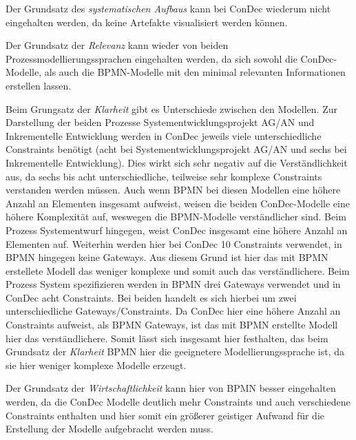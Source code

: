 Der  Grundsatz des \textit{systematischen Aufbaus} kann bei ConDec wiederum nicht eingehalten werden, da keine Artefakte visualisiert werden können.\newline

Der Grundsatz der \textit{Relevanz} kann wieder von beiden Prozessmodellierungssprachen eingehalten werden, da sich sowohl die ConDec-Modelle, als auch die BPMN-Modelle mit den minimal relevanten Informationen erstellen lassen.\newline


Beim Grungsatz der \textit{Klarheit} gibt es Unterschiede zwischen den Modellen. Zur Darstellung der beiden Prozesse Systementwicklungsprojekt AG/AN und Inkrementelle Entwicklung werden in ConDec jeweils viele unterschiedliche Constraints benötigt (acht bei Systementwicklungsprojekt AG/AN und sechs bei Inkrementelle Entwicklung). Dies wirkt sich sehr negativ auf die Verständlichkeit aus, da sechs bis acht unterschiedliche, teilweise sehr komplexe Constraints verstanden werden müssen. Auch wenn BPMN bei diesen Modellen eine höhere Anzahl an Elementen insgesamt aufweist, weisen die beiden ConDec-Modelle eine höhere Komplexität auf, weswegen die BPMN-Modelle verständlicher sind. \newline
Beim Prozess Systementwurf hingegen, weist ConDec  insgesamt eine höhere Anzahl an Elementen auf. Weiterhin werden hier bei ConDec 10 Constraints verwendet, in BPMN hingegen keine Gateways. Aus diesem Grund ist hier das mit BPMN erstellete Modell das weniger komplexe und somit auch das verständlichere.\newline
Beim Prozess System spezifizieren werden in BPMN drei Gateways verwendet und in ConDec acht Constraints. Bei beiden handelt es sich hierbei um zwei unterschiedliche Gateways/Constraints. Da ConDec hier eine höhere Anzahl an Constraints aufweist, als BPMN Gateways, ist das mit BPMN erstellte Modell hier das verständlichere. \newline
Somit lässt sich insgesamt hier festhalten, das beim Grundsatz der \textit{Klarheit} BPMN hier die geeignetere Modellierungssprache ist, da sie hier weniger komplexe Modelle erzeugt.\newline

Der Grundsatz der \textit{Wirtschaftlichkeit} kann hier von BPMN besser eingehalten werden, da die ConDec Modelle deutlich mehr Constraints und auch verschiedene Constraints enthalten und hier somit ein größerer geistiger Aufwand für die Erstellung der Modelle aufgebracht werden muss.\newline


